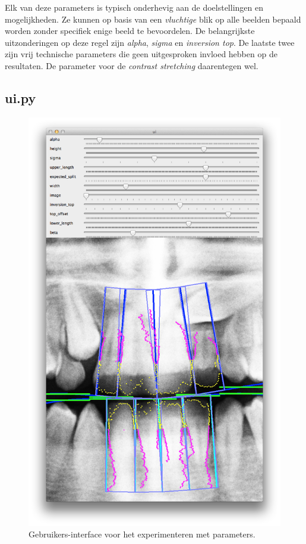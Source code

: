 \documentclass[10pt,a4paper]{article}
\begin{document}
Elk van deze parameters is typisch onderhevig aan de doelstellingen en mogelijkheden. Ze kunnen op basis van een \emph{vluchtige} blik op alle beelden bepaald worden zonder specifiek enige beeld te bevoordelen. De belangrijkste uitzonderingen op deze regel zijn \emph{alpha}, \emph{sigma} en \emph{inversion top}. De laatste twee zijn vrij technische parameters die geen uitgesproken invloed hebben op de resultaten. De parameter voor de \emph{contrast stretching} daarentegen wel.

\subsection*{ui.py}

\begin{figure}
  \vspace{-1cm}
  \centering
  \includegraphics[width=\linewidth]{resources/ui.png}
  \caption{Gebruikers-interface voor het experimenteren met parameters.}
  \label{fig:ui}
  \vspace{-1cm}
\end{figure}
\end{document}
